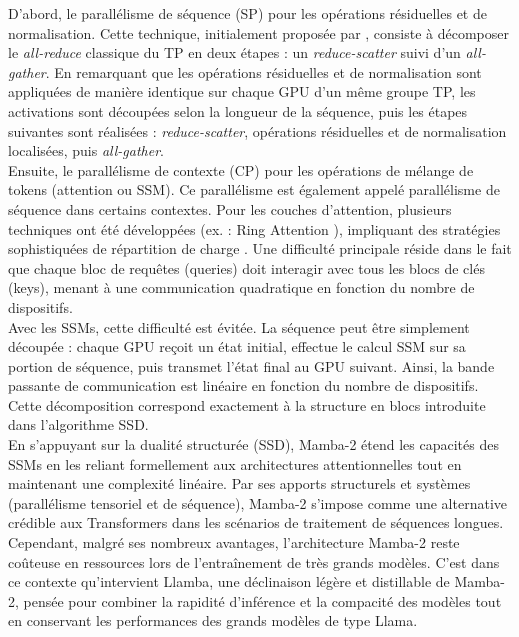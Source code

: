 D'abord, le parallélisme de séquence (SP) pour les opérations résiduelles et de normalisation. Cette technique, initialement proposée par \citep{korthikanti2023}, consiste à décomposer le \textit{all-reduce} classique du TP en deux étapes : un \textit{reduce-scatter} suivi d’un \textit{all-gather}. En remarquant que les opérations résiduelles et de normalisation sont appliquées de manière identique sur chaque GPU d’un même groupe TP, les activations sont découpées selon la longueur de la séquence, puis les étapes suivantes sont réalisées : \textit{reduce-scatter}, opérations résiduelles et de normalisation localisées, puis \textit{all-gather}.\\

Ensuite, le parallélisme de contexte (CP) pour les opérations de mélange de tokens (attention ou SSM). Ce parallélisme est également appelé parallélisme de séquence dans certains contextes. Pour les couches d’attention, plusieurs techniques ont été développées (ex. : Ring Attention \citep{liu2024ring, liu2023bandwidth}), impliquant des stratégies sophistiquées de répartition de charge \citep{brandon2023balanced}. Une difficulté principale réside dans le fait que chaque bloc de requêtes (queries) doit interagir avec tous les blocs de clés (keys), menant à une communication quadratique en fonction du nombre de dispositifs.\\

Avec les SSMs, cette difficulté est évitée. La séquence peut être simplement découpée : chaque GPU reçoit un état initial, effectue le calcul SSM sur sa portion de séquence, puis transmet l’état final au GPU suivant. Ainsi, la bande passante de communication est linéaire en fonction du nombre de dispositifs. Cette décomposition correspond exactement à la structure en blocs introduite dans l’algorithme SSD.\\

En s’appuyant sur la dualité structurée (SSD), Mamba-2 étend les capacités des SSMs en les reliant formellement aux architectures attentionnelles tout en maintenant une complexité linéaire. Par ses apports structurels et systèmes (parallélisme tensoriel et de séquence), Mamba-2 s’impose comme une alternative crédible aux Transformers dans les scénarios de traitement de séquences longues. Cependant, malgré ses nombreux avantages, l’architecture Mamba-2 reste coûteuse en ressources lors de l'entraînement de très grands modèles. C’est dans ce contexte qu'intervient Llamba, une déclinaison légère et distillable de Mamba-2, pensée pour combiner la rapidité d’inférence et la compacité des modèles tout en conservant les performances des grands modèles de type Llama. 

